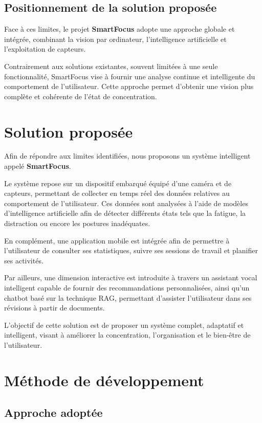 \subsection{Positionnement de la solution proposée}

Face à ces limites, le projet \textbf{SmartFocus} adopte une approche globale et intégrée, combinant la vision par ordinateur, l’intelligence artificielle et l’exploitation de capteurs.

Contrairement aux solutions existantes, souvent limitées à une seule fonctionnalité, SmartFocus vise à fournir une analyse continue et intelligente du comportement de l’utilisateur. Cette approche permet d’obtenir une vision plus complète et cohérente de l’état de concentration.

\section{Solution proposée}
\label{sec:solution}

Afin de répondre aux limites identifiées, nous proposons un système intelligent appelé \textbf{SmartFocus}.

Le système repose sur un dispositif embarqué équipé d'une caméra et de capteurs, permettant de collecter en temps réel des données relatives au comportement de l'utilisateur. Ces données sont analysées à l’aide de modèles d’intelligence artificielle afin de détecter différents états tels que la fatigue, la distraction ou encore les postures inadéquates.

En complément, une application mobile est intégrée afin de permettre à l’utilisateur de consulter ses statistiques, suivre ses sessions de travail et planifier ses activités.

Par ailleurs, une dimension interactive est introduite à travers un assistant vocal intelligent capable de fournir des recommandations personnalisées, ainsi qu’un chatbot basé sur la technique \ac{RAG}, permettant d’assister l’utilisateur dans ses révisions à partir de documents.

L’objectif de cette solution est de proposer un système complet, adaptatif et intelligent, visant à améliorer la concentration, l’organisation et le bien-être de l’utilisateur.

\section{Méthode de développement}

\subsection{Approche adoptée}

